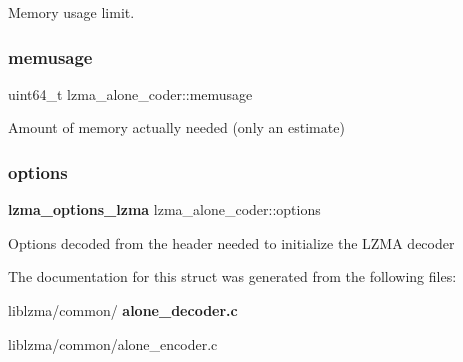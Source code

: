 Memory usage limit. 

\mbox{\label{structlzma__alone__coder_a1c20d87e58d50b1bd4888b1049735615}} 
\subsubsection{memusage}
{\footnotesize\ttfamily uint64\+\_\+t lzma\+\_\+alone\+\_\+coder\+::memusage}



Amount of memory actually needed (only an estimate) 

\mbox{\label{structlzma__alone__coder_ad056c557eb89a30aae814efaa2f4ef3d}} 
\subsubsection{options}
{\footnotesize\ttfamily \textbf{ lzma\+\_\+options\+\_\+lzma} lzma\+\_\+alone\+\_\+coder\+::options}

Options decoded from the header needed to initialize the L\+Z\+MA decoder 

The documentation for this struct was generated from the following files\+:\begin{DoxyCompactItemize}
\item 
liblzma/common/\textbf{ alone\+\_\+decoder.\+c}\item 
liblzma/common/alone\+\_\+encoder.\+c\end{DoxyCompactItemize}
